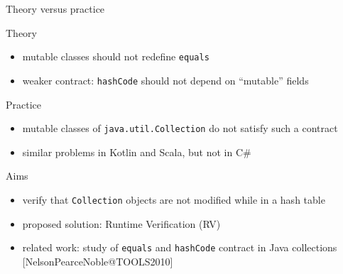 \documentclass[10pt,usenames,dvipsnames]{beamer}
\begin{document}
\begin{frame}[fragile]{Theory versus practice}
  \begin{block}{Theory}
    \begin{itemize}
    \item mutable classes should not redefine \lstinline{equals}
    \item weaker contract: \lstinline{hashCode} should not depend on ``mutable'' fields
    \end{itemize}   
  \end{block}

  \begin{block}{Practice}
    \begin{itemize}
    \item mutable classes of \lstinline{java.util.Collection} do not satisfy such a contract 
    \item similar problems in Kotlin and Scala, but not in C\#
    \end{itemize}   
  \end{block}


    \begin{block}{Aims}
    \begin{itemize}
    \item verify that \lstinline{Collection} objects are not modified while in a hash table
    \item proposed solution: Runtime Verification (RV)
    \item related work: study of \lstinline{equals} and \lstinline{hashCode} contract in Java collections
       [NelsonPearceNoble@TOOLS2010]
    \end{itemize}   
  \end{block}

\end{frame}



\end{document}
